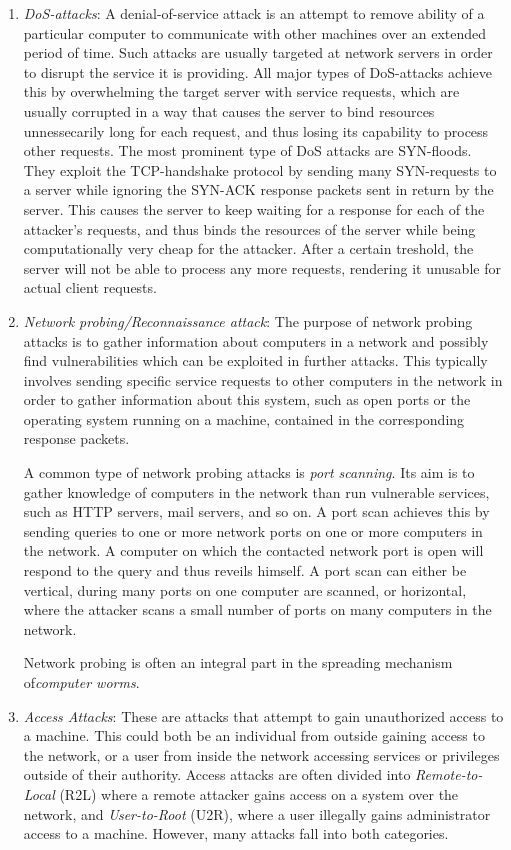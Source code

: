 \documentclass[a4paper,12pt,twoside]{report}
\begin{document}
\begin{enumerate}
\item \textit{DoS-attacks}: A denial-of-service attack is an attempt to remove ability of a particular computer to communicate with other machines over an extended period of time. Such attacks are usually targeted at network servers in order to disrupt the service it is providing. All major types of DoS-attacks achieve this by overwhelming the target server with service requests, which are usually corrupted in a way that causes the server to bind resources unnessecarily long for each request, and thus losing its capability to process other requests. The most prominent type of DoS attacks are SYN-floods. They exploit the TCP-handshake protocol by sending many SYN-requests to a server while ignoring the SYN-ACK response packets sent in return by the server. This causes the server to keep waiting for a response for each of the attacker's requests, and thus binds the resources of the server while being computationally very cheap for the attacker. After a certain treshold, the server will not be able to process any more requests, rendering it unusable for actual client requests.

\item \textit{Network probing/Reconnaissance attack}: The purpose of network probing attacks is to gather information about computers in a network and possibly find vulnerabilities which can be exploited in further attacks. This typically involves sending specific service requests to other computers in the network in order to gather information about this system, such as open ports or the operating system running on a machine, contained in the corresponding response packets.

A common type of network probing attacks is \textit{port scanning}. Its aim is to gather knowledge of computers in the network than run vulnerable services, such as HTTP servers, mail servers, and so on. A port scan achieves this by sending queries to one or more network ports on one or more computers in the network. A computer on which the contacted network port is open will respond to the query and thus reveils himself. A port scan can either be vertical, during many ports on one computer are scanned, or horizontal, where the attacker scans a small number of ports on many computers in the network. 

Network probing is often an integral part in the spreading mechanism of\textit{computer worms}.

\item \textit{Access Attacks}: These are attacks that attempt to gain unauthorized access to a machine. This could both be an individual from outside gaining access to the network, or a user from inside the network accessing services or privileges outside of their authority. Access attacks are often divided into \textit{Remote-to-Local} (R2L) where a remote attacker gains access on a system over the network, and \textit{User-to-Root} (U2R), where a user illegally gains administrator access to a machine. However, many attacks fall into both categories. 


\end{enumerate}
\end{document}
